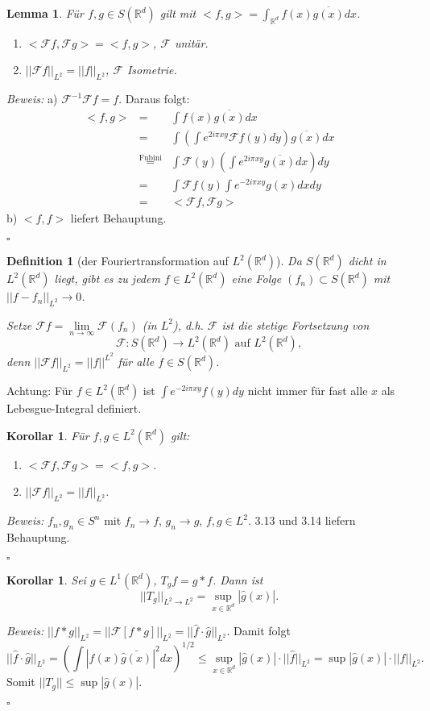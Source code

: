 \documentclass[11pt,a4paper,titlepage, ngerman]{scrartcl}
\newtheorem{Definition}[Satz]{Definition}
\newtheorem{Lemma}[Satz]{Lemma}
\newtheorem{Korollar}[Satz]{Korollar}
\numberwithin{equation}{section}
\newcommand{\R}{\mathbb{R}} %
\newcommand{\f}{\hat{f}}
\newcommand{\g}{\hat{g}}
\newcommand{\F}{\mathcal{F}}
\newcommand{\m}{\cdot}
\newcommand{\Bew}{\emph{Beweis: }}
\newcommand{\qed}{\begin{flushright}
		$\square$
	\end{flushright}}
\begin{document}
	\begin{Lemma}
		Für $f, g\in S(\R^d)$ gilt mit $<f,g> = \int_{\R^{d}} f(x) \overline{g(x)}dx$.
		\begin{enumerate}
			\item[a)] $<\F f,\F g> = <f,g>$, $\F$ unitär.
			\item[b)] $||\F f||_{L^2} = ||f||_{L^2}$, $\F$ Isometrie.
		\end{enumerate}
	\end{Lemma}
	\Bew a) $\F^{-1}\F f = f$. Daraus folgt:
	\begin{eqnarray}
		<f,g> &=&\int f(x)\overline{g(x)}dx\nonumber\\
		&=& \int\left(\int e^{2i\pi x y}\F f(y)dy \right)\overline{g(x)}dx \nonumber \\
		&\overset{\text{Fubini}}{=}& \int \F(y)\left(\int e^{2i\pi xy} \overline{g(x)}dx\right)dy\nonumber\\
		&=& \int \F f(y) \int e^{-2i\pi xy}g(x)dx dy\nonumber\\
		&=& <\F f, \F g>\nonumber
	\end{eqnarray}
	b) $<f,f>$ liefert Behauptung.
	\qed
	
	\begin{Definition}[der Fouriertransformation auf $L^2(\R^d)$]
		Da $S(\R^d)$ dicht in $L^{2}(\R^d)$ liegt, gibt es zu jedem $f\in L^{2}(\R^d)$ eine Folge $(f_n)\subset S(\R^d)$ mit $||f-f_n||_{L^2}\rightarrow 0$.
		
		Setze $\F f =\lim\limits_{n\rightarrow\infty}\F(f_n)$ (in $L^2$), d.h. $\F$ ist die stetige Fortsetzung von 
		$$\F:S(\R^d)\rightarrow L^2(\R^d) \text{ auf } L^2(\R^d),$$	
		denn $||\F f||_{L^2} = ||f||^{L^2}$ für alle $f\in S(\R^d)$.
	\end{Definition}
	Achtung: Für $f\in L^2(\R^d)$ ist $\int e^{-2i\pi xy}f(y)dy$ nicht immer für fast alle $x$ als Lebesgue-Integral definiert.
	
	\begin{Korollar}
		Für $f, g\in L^2(\R^d)$ gilt:
		\begin{enumerate}
			\item[a)] $<\F f,\F g> = <f,g>$.
			\item[b)] $||\F f||_{L^2} = ||f||_{L^2}$.
		\end{enumerate}
	\end{Korollar}
	\Bew $f_n,g_n\in S^n$ mit $f_n\rightarrow f$, $g_n\rightarrow g$, $f,g\in L^2$. 3.13 und 3.14 liefern Behauptung.
	\qed
	
	\begin{Korollar}
		Sei $g\in L^{1}(\R^d)$, $T_g f= g*f$. Dann ist 
		$$||T_g||_{L^2\rightarrow L^2} = \sup_{x\in \R^d}|\g(x)|.$$
	\end{Korollar}
	\Bew $||f*g||_{L^2} = ||\F[f*g]||_{L^2} = ||\f\m\g||_{L^2}$.  Damit folgt
	$$||\f\m\g||_{L^2} = \left(\int |f(x)\bar{\g(x)}|^2 dx \right)^{1/2}\leq \sup_{x\in \R^d}|\g(x)|\m||\f||_{L^2} = \sup|\g(x)|\m ||f||_{L^2}.$$
	Somit $||T_g||\leq \sup|\g(x)|$.
	\qed 
	
\end{document}
